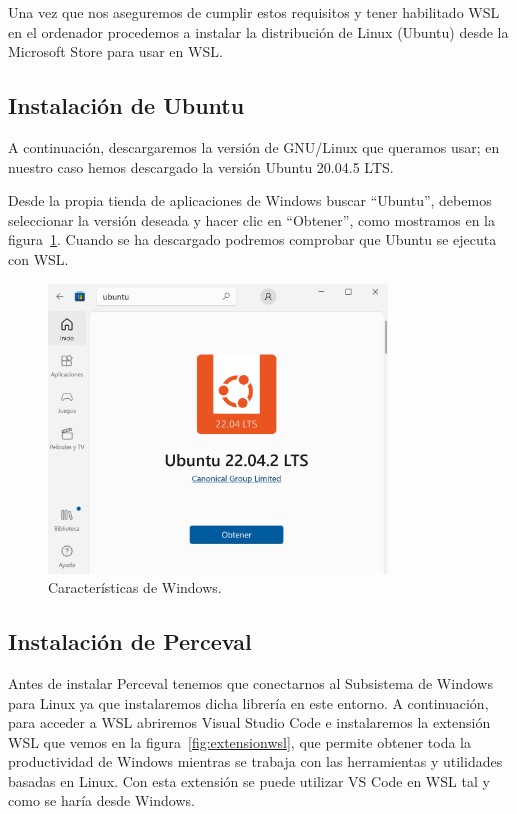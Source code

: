 \documentclass[a4paper, 12pt]{book}
\begin{document}
Una vez que nos aseguremos de cumplir estos requisitos y tener habilitado WSL en el ordenador procedemos a instalar la distribución de Linux (Ubuntu) desde la Microsoft Store para usar en WSL. 

\subsection{Instalación de Ubuntu} %
\label{sec:instalación de ubuntu}

A continuación, descargaremos la versión de GNU/Linux que queramos usar; en nuestro caso hemos descargado la versión Ubuntu 20.04.5 LTS.


Desde la propia tienda de aplicaciones de Windows buscar ``Ubuntu'', debemos seleccionar la versión deseada y hacer clic en ``Obtener'', como mostramos en la figura~\ref{fig:ubuntu}.
Cuando se ha descargado podremos comprobar que Ubuntu se ejecuta con WSL.

\begin{figure}
  \centering
  \includegraphics[width=9cm, keepaspectratio]{img/Ubuntu.PNG}
  \caption{Características de Windows.}\label{fig:ubuntu}
\end{figure}

\subsection{Instalación de Perceval} %
\label{sec:instalación de perceval}

Antes de instalar Perceval tenemos que conectarnos al Subsistema de Windows para Linux ya que instalaremos dicha librería en este entorno.
A continuación, para acceder a WSL abriremos Visual Studio Code e instalaremos la extensión WSL que vemos en la figura~\ref{fig:extensionwsl}, que permite obtener toda la productividad de Windows mientras se trabaja con las herramientas y utilidades basadas en Linux.
Con esta extensión se puede utilizar VS Code en WSL tal y como se haría desde Windows.
\end{document}
